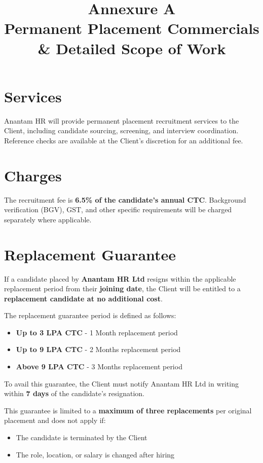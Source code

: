 \documentclass[12pt]{article}
\title{
\vspace{-1cm}
\textcolor{primary}{\Huge \textbf{Annexure A}} \\
\vspace{0.4cm}
\Large Permanent Placement Commercials \\
\Large \& Detailed Scope of Work
}
\date{}
\begin{document}
\maketitle
\thispagestyle{fancy}


\section{Services}

Anantam HR will provide permanent placement recruitment services to the Client, including candidate sourcing, screening, and interview coordination. Reference checks are available at the Client's discretion for an additional fee.

\section{Charges}

The recruitment fee is \textbf{6.5\% of the candidate's annual CTC}. Background verification (BGV), GST, and other specific requirements will be charged separately where applicable.

\section{Replacement Guarantee}

If a candidate placed by \textbf{Anantam HR Ltd} resigns within the applicable replacement period from their \textbf{joining date}, the Client will be entitled to a \textbf{replacement candidate at no additional cost}.

The replacement guarantee period is defined as follows:

\begin{itemize}[leftmargin=1.2cm]
\item \textbf{Up to 3 LPA CTC} - 1 Month replacement period
\item \textbf{Up to 9 LPA CTC} - 2 Months replacement period
\item \textbf{Above 9 LPA CTC} - 3 Months replacement period
\end{itemize}

To avail this guarantee, the Client must notify Anantam HR Ltd in writing within \textbf{7 days} of the candidate's resignation.

This guarantee is limited to a \textbf{maximum of three replacements} per original placement and does not apply if:

\begin{itemize}
\item The candidate is terminated by the Client
\item The role, location, or salary is changed after hiring
\end{itemize}
\end{document}
